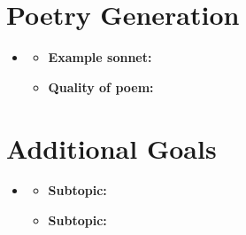 
\section{Poetry Generation}
\medskip
\begin{itemize}

    \item {}

    \begin{itemize}
    \item \textbf{Example sonnet:}
    \item \textbf{Quality of poem:}
    \end{itemize}


\end{itemize}








\section{Additional Goals}
\medskip
\begin{itemize}

    \item {}

    \begin{itemize}
    \item \textbf{Subtopic:}
    \item \textbf{Subtopic:}
    \end{itemize}

\end{itemize}

